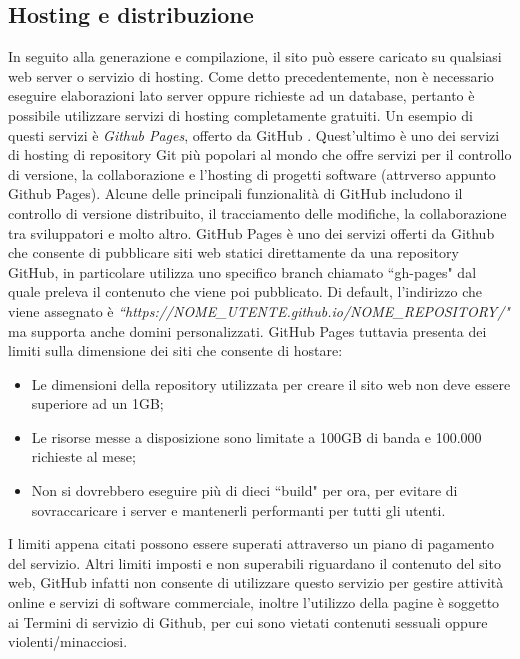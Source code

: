 \documentclass[target=bach,aauheader=]{thud}
\begin{document}
\subsection{Hosting e distribuzione}\label{subsec:hosting}
In seguito alla generazione e compilazione, il sito può essere caricato su qualsiasi web server o servizio di hosting. Come detto precedentemente, non è necessario eseguire elaborazioni lato server oppure richieste ad un database, pertanto è possibile utilizzare servizi di hosting completamente gratuiti.
\newline
Un esempio di questi servizi è \textit{Github Pages}, offerto da GitHub \cite{github-pages}. Quest'ultimo è uno dei servizi di hosting di repository Git più popolari al mondo che offre servizi per il controllo di versione, la collaborazione e l'hosting di progetti software (attrverso appunto Github Pages).
Alcune delle principali funzionalità di GitHub includono il controllo di versione distribuito, il tracciamento delle modifiche, la collaborazione tra sviluppatori e molto altro.
GitHub Pages è uno dei servizi offerti da Github che consente di pubblicare siti web statici direttamente da una repository GitHub, in particolare utilizza uno specifico branch chiamato ``gh-pages" dal quale preleva il contenuto che viene poi pubblicato.
Di default, l'indirizzo che viene assegnato è \textit{``https://NOME\_UTENTE.github.io/NOME\_REPOSITORY/"} ma supporta anche domini personalizzati. 
\newline 
GitHub Pages tuttavia presenta dei limiti sulla dimensione dei siti che consente di hostare:
\begin{itemize}
    \item Le dimensioni della repository utilizzata per creare il sito web non deve essere superiore ad un 1GB;
    \item Le risorse messe a disposizione sono limitate a 100GB di banda e 100.000 richieste al mese;
    \item Non si dovrebbero eseguire più di dieci ``build" per ora, per evitare di sovraccaricare i server e mantenerli performanti per tutti gli utenti.
\end{itemize}
I limiti appena citati possono essere superati attraverso un piano di pagamento del servizio.
\newline
Altri limiti imposti e non superabili riguardano il contenuto del sito web, GitHub infatti non consente di utilizzare questo servizio per gestire attività online e servizi di software commerciale, inoltre l'utilizzo della pagine è soggetto ai Termini di servizio di Github,
per cui sono vietati contenuti sessuali oppure violenti/minacciosi. 
\end{document}
